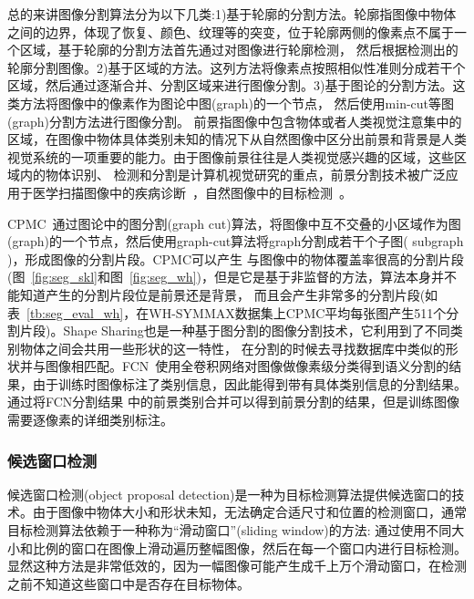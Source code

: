 \documentclass[UTF8]{ctexart}
\numberwithin{equation}{section} %
\numberwithin{table}{section} %
\begin{document}
总的来讲图像分割算法分为以下几类:1)基于轮廓的分割方法。轮廓指图像中物体之间的边界，体现了恢复、颜色、纹理等的突变，位于轮廓两侧的像素点不属于一个区域，基于轮廓的分割方法首先通过对图像进行轮廓检测，
然后根据检测出的轮廓分割图像。2)基于区域的方法。这列方法将像素点按照相似性准则分成若干个区域，然后通过逐渐合并、分割区域来进行图像分割。3)基于图论的分割方法。这类方法将图像中的像素作为图论中图(graph)的一个节点，
然后使用min-cut等图(graph)分割方法进行图像分割。
前景指图像中包含物体或者人类视觉注意集中的区域，在图像中物体具体类别未知的情况下从自然图像中区分出前景和背景是人类视觉系统的一项重要的能力。由于图像前景往往是人类视觉感兴趣的区域，这些区域内的物体识别、
检测和分割是计算机视觉研究的重点，前景分割技术被广泛应用于医学扫描图像中的疾病诊断~\cite{pereira2014segmentation}，自然图像中的目标检测~\cite{girshick2014rich}。

CPMC~\cite{carreira2010constrained}通过图论中的图分割(graph cut)算法，将图像中互不交叠的小区域作为图(graph)的一个节点，然后使用graph-cut算法将graph分割成若干个子图( subgraph )，形成图像的分割片段。CPMC可以产生
与图像中的物体覆盖率很高的分割片段(图~\ref{fig:seg_skl}和图~\ref{fig:seg_wh})，但是它是基于非监督的方法，算法本身并不能知道产生的分割片段位是前景还是背景，
而且会产生非常多的分割片段(如表~\ref{tb:seg_eval_wh}，在WH-SYMMAX数据集上CPMC平均每张图产生511个分割片段)。Shape Sharing也是一种基于图分割的图像分割技术，它利用到了不同类别物体之间会共用一些形状的这一特性，
在分割的时候去寻找数据库中类似的形状并与图像相匹配。FCN~\cite{long2015fully}使用全卷积网络对图像做像素级分类得到语义分割的结果，由于训练时图像标注了类别信息，因此能得到带有具体类别信息的分割结果。通过将FCN分割结果
中的前景类别合并可以得到前景分割的结果，但是训练图像需要逐像素的详细类别标注。

\subsubsection{候选窗口检测}
候选窗口检测(object proposal detection)是一种为目标检测算法提供候选窗口的技术。由于图像中物体大小和形状未知，无法确定合适尺寸和位置的检测窗口，通常目标检测算法依赖于一种称为“滑动窗口”(sliding window)的方法:
通过使用不同大小和比例的窗口在图像上滑动遍历整幅图像，然后在每一个窗口内进行目标检测。显然这种方法是非常低效的，因为一幅图像可能产生成千上万个滑动窗口，在检测之前不知道这些窗口中是否存在目标物体。
\end{document}
